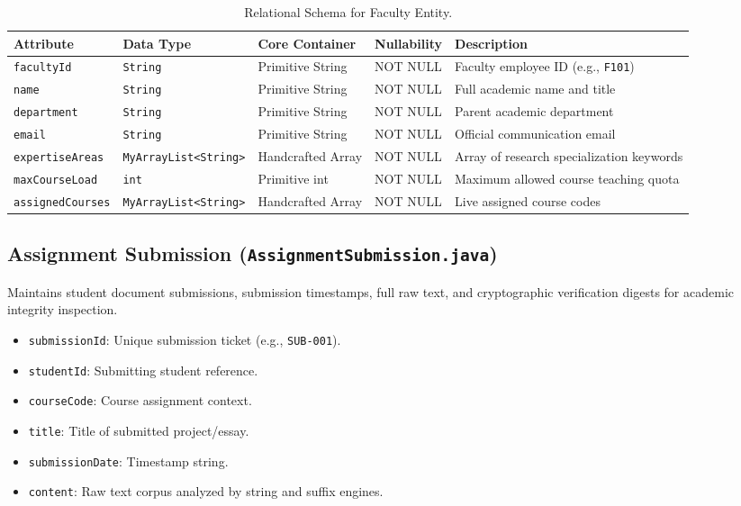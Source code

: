\begin{table}[H]
\centering
\small
\begin{tabularx}{\textwidth}{llllX}
\toprule
\textbf{Attribute} & \textbf{Data Type} & \textbf{Core Container} & \textbf{Nullability} & \textbf{Description} \\
\midrule
\texttt{facultyId} & \texttt{String} & Primitive String & NOT NULL & Faculty employee ID (e.g., \texttt{F101}) \\
\texttt{name} & \texttt{String} & Primitive String & NOT NULL & Full academic name and title \\
\texttt{department} & \texttt{String} & Primitive String & NOT NULL & Parent academic department \\
\texttt{email} & \texttt{String} & Primitive String & NOT NULL & Official communication email \\
\texttt{expertiseAreas} & \texttt{MyArrayList<String>} & Handcrafted Array & NOT NULL & Array of research specialization keywords \\
\texttt{maxCourseLoad} & \texttt{int} & Primitive int & NOT NULL & Maximum allowed course teaching quota \\
\texttt{assignedCourses} & \texttt{MyArrayList<String>} & Handcrafted Array & NOT NULL & Live assigned course codes \\
\bottomrule
\end{tabularx}
\caption{Relational Schema for Faculty Entity.}
\label{tab:faculty_schema}
\end{table}

\subsection{Assignment Submission (\texttt{AssignmentSubmission.java})}
Maintains student document submissions, submission timestamps, full raw text, and cryptographic verification digests for academic integrity inspection.
\begin{itemize}
    \item \texttt{submissionId}: Unique submission ticket (e.g., \texttt{SUB-001}).
    \item \texttt{studentId}: Submitting student reference.
    \item \texttt{courseCode}: Course assignment context.
    \item \texttt{title}: Title of submitted project/essay.
    \item \texttt{submissionDate}: Timestamp string.
    \item \texttt{content}: Raw text corpus analyzed by string and suffix engines.
\end{itemize}

